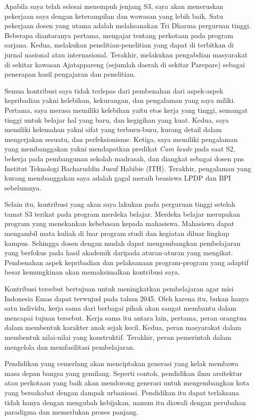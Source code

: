 \documentclass{article}
\begin{document}
Apabila saya telah selesai menempuh jenjang S3,
saya akan meneruskan pekerjaan saya dengan keterampilan dan wawasan yang lebih baik. Satu pekerjaan dosen yang utama adalah melaksanakan Tri Dharma perguruan tinggi. Beberapa diantaranya pertama, mengajar tentang perkotaan pada program sarjana. Kedua, melakukan penelitian-penelitian yang dapat di terbitkan di jurnal nasional atau internasional. Terakhir, melakukan pengabdian masyarakat di sekitar kawasan Ajatappareng (sejumlah daerah di sekitar Parepare) sebagai penerapan hasil pengajaran dan penelitian.

Semua kontribusi saya tidak terlepas dari pembenahan dari aspek-aspek kepribadian yakni kelebihan, kekurangan, dan pengalaman yang saya miliki.
Pertama, saya merasa memiliki kelebihan yaitu etos kerja yang tinggi, semangat tinggi untuk belajar hal yang baru, dan kegigihan yang kuat. Kedua, saya memiliki kelemahan yakni sifat yang terburu-buru, kurang detail dalam mengerjakan sesuatu, dan perfeksionisme.
Ketiga, saya memiliki pengalaman yang membanggakan yakni mendapatkan predikat \textit{Cum laude} pada saat S2, bekerja pada pembangunan sekolah madrasah, dan diangkat sebagai dosen pns Institut Teknologi Bacharuddin Jusuf Habibie (ITH). Terakhir, pengalaman yang kurang membanggakan saya adalah gagal meraih beasiswa LPDP dan BPI sebelumnya.

Selain itu, kontribusi yang akan saya lakukan pada perguruan tinggi setelah tamat S3 terikat pada program merdeka belajar.
Merdeka belajar merupakan program yang menekankan kebebasan kepada mahasiswa.
Mahasiswa dapat mengambil mata kuliah di luar program studi dan kegiatan diluar lingkup kampus.
Sehingga dosen dengan mudah dapat mengembangkan pembelajaran yang berfokus pada hasil akademik daripada aturan-aturan yang mengikat. Pembenahan aspek kepribadian dan pelaksanaan program-program yang adaptif besar kemungkinan akan memaksimalkan kontribusi saya.

Kontribusi tersebut bertujuan untuk meningkatkan pembelajaran agar misi Indonesia Emas dapat terwujud pada tahun 2045. Oleh karena itu, bukan hanya satu individu, kerja sama dari berbagai pihak akan sangat membantu dalam mencapai tujuan tersebut.
Kerja sama itu antara lain, pertama, peran orangtua dalam membentuk karakter anak sejak kecil. Kedua, peran masyarakat dalam membentuk nilai-nilai yang konstruktif. Terakhir, peran pemerintah dalam mengelola dan memfasilitasi pembelajaran.

Pendidikan yang cemerlang akan menciptakan generasi yang kelak membawa masa depan bangsa yang gemilang.
Seperti contoh, pendidikan ilmu arsitektur atau perkotaan yang baik akan mendorong generasi untuk mengembangkan kota yang bersahabat dengan dampak urbanisasi.
Pendidikan itu dapat terlaksana tidak hanya dengan mengubah kebijakan, namun itu diawali dengan perubahan paradigma dan memerlukan proses panjang.




\end{document}
